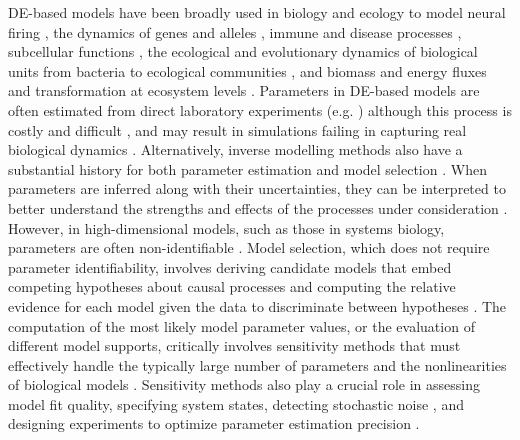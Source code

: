 DE-based models have been broadly used in biology and ecology to model neural firing \cite{hodgkin1952quantitative}, the dynamics of genes and alleles \cite{Page2002}, immune and disease processes \cite{colijn2006high}, subcellular functions \cite{brown2003statistical}, the ecological and evolutionary dynamics of biological units from bacteria to ecological communities \cite{Gabor2015, Lion2018, Villa2021, Boussange2022, boussange2023a, Akesson2021, chalmandrier2021, VandenBerg2022}, and biomass and energy fluxes and transformation at ecosystem levels \cite{Weng2015, Schartau2017, Franklin2020, Geary2020}.
Parameters in DE-based models are often estimated from direct laboratory experiments (e.g. \cite{hodgkin1952quantitative}) although this process is costly and difficult \cite{Schartau2017}, and may result in simulations failing in capturing real biological dynamics \cite{Watts2001}. 
Alternatively, inverse modelling methods also have a substantial history for both parameter estimation \cite{ramsay2007parameter,ramsay2017dynamic,Schartau2017,ding2000h,fussmann2000crossing} and model selection \cite{Johnson2004,zhang2015selection,alsos2023,pantel2023}.
When parameters are inferred along with their uncertainties, they can be interpreted to better understand the strengths and effects of the processes under consideration \cite{Pontarp2019, Higgins2010, Curtsdotter2019, godwin2020}. However, in high-dimensional models, such as those in systems biology, parameters are often non-identifiable \cite{transtrum2011geometry}. Model selection, which does not require parameter identifiability, involves deriving candidate models that embed competing hypotheses about causal processes and computing the relative evidence for each model given the data to discriminate between hypotheses \cite{Johnson2004, alsos2023}.
The computation of the most likely model parameter values, or the evaluation of different model supports, critically involves sensitivity methods that must effectively handle the typically large number of parameters and the nonlinearities of biological models \cite{transtrum2011geometry, Gabor2015}.
Sensitivity methods also play a crucial role in assessing model fit quality, specifying system states, detecting stochastic noise \cite{hooker2009forcing, hooker2015goodness, liu2023specification}, and designing experiments to optimize parameter estimation precision \cite{bauer2000numerical}.

